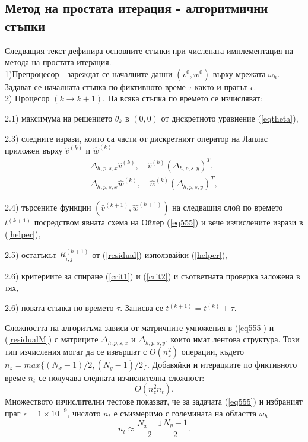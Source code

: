 \documentclass{article}
\newcommand{\be}{\begin{equation}}
\newcommand{\ee}{\end{equation}}
\newcommand{\rf}[1]{(\ref{#1})}
\begin{document}
\subsection{Метод на простата итерация - алгоритмични стъпки}
Следващия текст дефинира основните стъпки при числената имплементация на метода на простата итерация.
\\
1)Препроцесор - зареждат се началните данни $(v^0, w^0)$ върху мрежата $\omega_h$.  Задават се началната стъпка по фиктивното време $\tau$ както и прагът $\epsilon$.
\\
2) Процесор $(k \rightarrow k+1)$. На всяка стъпка по времето се изчисляват: 
\par
2.1) максимума на решението $\theta_k$ в $(0,0)$  от дискретното уравнение \rf{eqtheta},
\par
2.3) следните изрази, които са части от дискретният оператор на Лаплас приложен върху $\widehat{v}^{(k)}$ и $\widehat{w}^{(k)}$
\begin{align}\label{helper}
\Delta_{h,p,s,x}  \widehat{v}^{(k)}, \quad \widehat{v}^{(k)}  (\Delta_{h,p,s,y})^T, \nonumber\\
\Delta_{h,p,s,x}  \widehat{w}^{(k)},\quad  \widehat{w}^{(k)}  (\Delta_{h,p,s,y})^T,
\end{align}
\par
2.4) търсените функции $(\widehat{v}^{(k+1)}, \widehat{w}^{(k+1)})$  на следващия слой по времето $t^{(k+1)}$ посредством явната схема на Ойлер \rf{eq555} и вече изчислените изрази в \rf{helper},
\par
2.5) остатъкът $R^{(k+1)}_{i,j}$ от \rf{residual} използвайки \rf{helper},
\par
2.6) критериите за спиране  \rf{crit1} и \rf{crit2} и съответната проверка заложена в тях,
\par
2.6) новата стъпка по времето $\tau$. Записва се $t^{(k+1)}=t^{(k)}+\tau$.

Сложността на алгоритъма зависи от матричните умножения в \rf{eq555} и \rf{residualM} с матриците $\Delta_{h,p,s,x}$ и $\Delta_{h,p,s,y}$, които имат лентова структура. Този тип изчисления могат да се извършат с $O(n_z^2)$ операции, където $n_z = max\{(N_x-1)/2, (N_y-1)/2\}$.  Добавяйки и итерациите по фиктивното време $n_t$ се получава следната изчислителна сложност:
\be\label{complexElpt}
O(n_z^2 n_t).
\ee
Множеството изчислителни тестове показват, че за задачата \rf{eq555} и избраният праг $\epsilon = 1 \times 10^{-9}$, числото $n_t$ е съизмеримо с големината на областта $\omega_h$
\be
n_t \approx \frac{N_x-1}{2} \frac{N_y-1}{2}.
\ee
\end{document}
